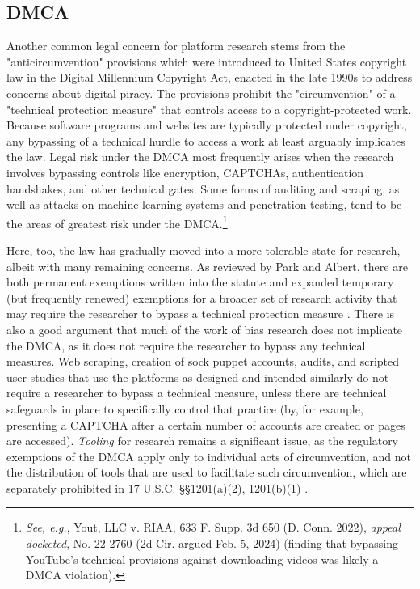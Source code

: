 \subsection{DMCA} 
Another common legal concern for platform research stems from the "anticircumvention" provisions which were introduced to United States copyright law in the Digital Millennium Copyright Act, enacted in the late 1990s to address concerns about digital piracy. The provisions prohibit the "circumvention" of a "technical protection measure" that controls access to a copyright-protected work. Because software programs and websites are typically protected under copyright, any bypassing of a technical hurdle to access a work at least arguably implicates the law. Legal risk under the DMCA most frequently arises when the research involves bypassing controls like encryption, CAPTCHAs, authentication handshakes, and other technical gates. Some forms of auditing and scraping, as well as attacks on machine learning systems and penetration testing, tend to be the areas of greatest risk under the DMCA.\footnote{\textit{See, e.g.}, Yout, LLC v. RIAA, 633 F. Supp. 3d 650 (D. Conn. 2022), \textit{appeal docketed}, No. 22-2760 (2d Cir. argued Feb. 5, 2024) (finding that bypassing YouTube's technical provisions against downloading videos was likely a DMCA violation).}

Here, too, the law has gradually moved into a more tolerable state for research, albeit with many remaining concerns. As reviewed by Park and Albert, there are both permanent exemptions written into the statute and expanded temporary (but frequently renewed) exemptions for a broader set of research activity that may require the researcher to bypass a technical protection measure \cite{parkResearchersGuideLegal}. There is also a good argument that much of the work of bias research does not implicate the DMCA, as it does not require the researcher to bypass any technical measures. Web scraping, creation of sock puppet accounts, audits, and scripted user studies that use the platforms as designed and intended similarly do not require a researcher to bypass a technical measure, unless there are technical safeguards in place to specifically control that practice (by, for example, presenting a CAPTCHA after a certain number of accounts are created or pages are accessed). \textit{Tooling} for research remains a significant issue, as the regulatory exemptions of the DMCA apply only to individual acts of circumvention, and not the distribution of tools that are used to facilitate such circumvention, which are separately prohibited in 17 U.S.C. §§1201(a)(2), 1201(b)(1) \cite{parkResearchersGuideLegal}.

